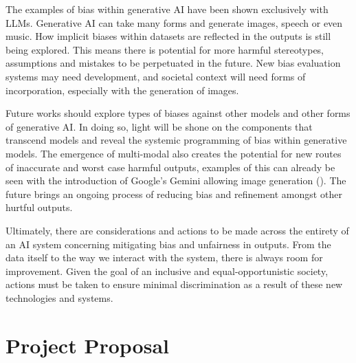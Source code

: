 \documentclass[12pt]{article}
\begin{document}
The examples of bias within generative AI have been shown exclusively with LLMs. Generative AI can take many forms and generate images, speech or even music. How implicit biases within datasets are reflected in the outputs is still being explored. This means there is potential for more harmful stereotypes, assumptions and mistakes to be perpetuated in the future. New bias evaluation systems may need development, and societal context will need forms of incorporation, especially with the generation of images.

Future works should explore types of biases against other models and other forms of generative AI. In doing so, light will be shone on the components that transcend models and reveal the systemic programming of bias within generative models. The emergence of multi-modal also creates the potential for new routes of inaccurate and worst case harmful outputs, examples of this can already be seen with the introduction of Google's Gemini allowing image generation (\cite{raghavan-2024}). The future brings an ongoing process of reducing bias and refinement amongst other hurtful outputs.

Ultimately, there are considerations and actions to be made across the entirety of an AI system concerning mitigating bias and unfairness in outputs. From the data itself to the way we interact with the system, there is always room for improvement. Given the goal of an inclusive and equal-opportunistic society, actions must be taken to ensure minimal discrimination as a result of these new technologies and systems.

\newpage

\printbibliography[title=Bibliography]

\appendix

\section{Project Proposal}
\end{document}
